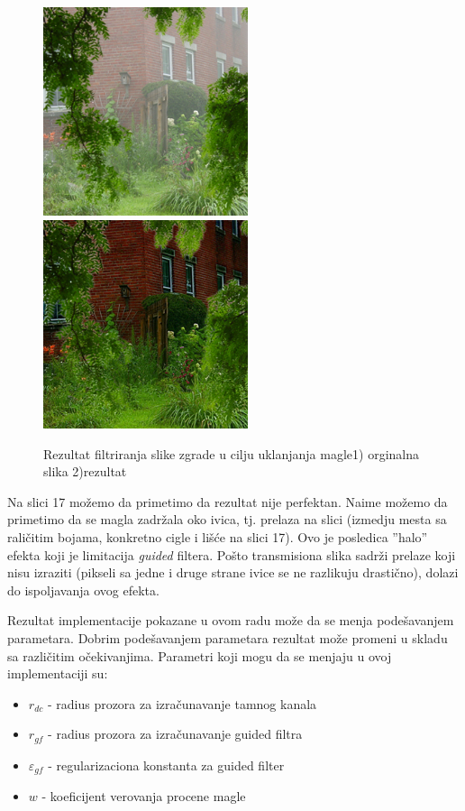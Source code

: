 \documentclass[a4paper,12pt,titlepage]{article}
\begin{document}
\begin{figure}[ht!]
\centering
\includegraphics[width=60mm]{img/haze.png}
\includegraphics[width=60mm]{img/hazeRes.png}
\caption{Rezultat filtriranja slike zgrade u cilju uklanjanja magle1) orginalna slika 2)rezultat}
\label{overflow}
\end{figure}   

Na slici 17 možemo da primetimo da rezultat nije perfektan. Naime možemo da primetimo da se magla zadržala oko ivica, tj. prelaza na slici (izmedju mesta sa raličitim bojama, konkretno cigle i lišće na slici 17). Ovo je posledica ''halo'' efekta koji je limitacija \emph{guided} filtera. Pošto transmisiona slika sadrži prelaze koji nisu izraziti (pikseli sa jedne i druge strane ivice se ne razlikuju drastično), dolazi do ispoljavanja ovog efekta.

Rezultat implementacije pokazane u ovom radu može da se menja podešavanjem parametara. Dobrim podešavanjem parametara rezultat može promeni u skladu sa različitim očekivanjima. Parametri koji mogu da se menjaju u ovoj implementaciji su:

\begin{itemize}
\item $r_{dc}$ - radius prozora za izračunavanje tamnog kanala 
\item $r_{gf}$ - radius prozora za izračunavanje guided filtra
\item $\varepsilon_{gf}$ - regularizaciona konstanta za guided filter 
\item $w$ - koeficijent verovanja procene magle
\end{itemize}
\end{document}
